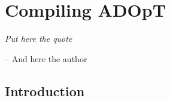 %
%
\chapter{Compiling ADOpT}
\label{ch:Compiling:ADOpT}
%
%
%
{\smaller
\hfill\textit{Put here the quote}

\hfill -- And here the author}
%
\section{Introduction}\label{sec:Intro:Compiling:ADOpT}

\lipsum
